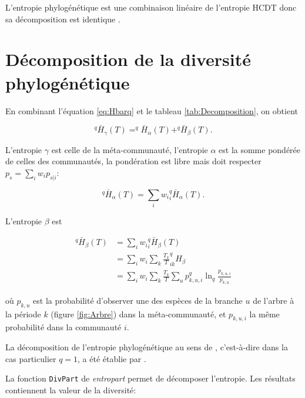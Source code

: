 \documentclass[
  11pt,
  french,
  a4paper,
  extrafontsizes,onecolumn,openright
  ]{memoir}
\begin{document}
\normalsize

L'entropie phylogénétique est une combinaison linéaire de l'entropie HCDT donc sa décomposition est identique \autocite{Marcon2014b}.

\hypertarget{duxe9composition-de-la-diversituxe9-phyloguxe9nuxe9tique}{%
\section{Décomposition de la diversité phylogénétique}\label{duxe9composition-de-la-diversituxe9-phyloguxe9nuxe9tique}}

En combinant l'équation \eqref{eq:Hbarq} et le tableau \ref{tab:Decomposition}, on obtient

\begin{equation}
  \label{eq:Hqbar}
  ^{q}\!\bar{H}_{\gamma}\left(T\right)
  = ^{q}\!\bar{H}_{\alpha}\left(T\right)
  + ^{q}\!\bar{H}_{\beta}\left(T\right).
\end{equation}

L'entropie \(\gamma\) est celle de la méta-communauté, l'entropie \(\alpha\) est la somme pondérée de celles des communautés, la pondération est libre mais doit respecter \(p_s=\sum_i{w_ip_{s|i}}\):

\begin{equation}
  \label{eq:Hqbaralpha}
  ^{q}\!\bar{H}_{\alpha}\left(T\right)
  = \sum_i{w_i{^{q}_{i}\!\bar{H}_{\alpha}}\left(T\right)}.
\end{equation}

L'entropie \(\beta\) est

\begin{align}
  \label{eq:Hqbarbeta}
  ^{q}\!\bar{H}_{\beta}\left(T\right)
  &= \sum_i{w_i}^{q}_{i}\!\bar{H}_{\beta}\left(T\right)\\
  &= \sum_i{w_i}\sum_k{\frac{T_k}{T}^{q}_{ik}\!H_{\beta}}\\
  &= \sum_i{w_i}\sum_k{\frac{T_k}{T}\sum_u{p^{q}_{k,u,i}\ln_q\frac{p_{k,u,i}}{p_{k,u}}}}
\end{align}

où \(p_{k,u}\) est la probabilité d'observer une des espèces de la branche \(u\) de l'arbre à la période \(k\) (figure \ref{fig:Arbre}) dans la méta-communauté, et \(p_{k,u,i}\) la même probabilité dans la communauté \(i\).

La décomposition de l'entropie phylogénétique au sens de \textcite{Allen2009}, c'est-à-dire dans la cas particulier \(q=1\), a été établie par \textcite{Mouchet2011}.

La fonction \texttt{DivPart} de \emph{entropart} permet de décomposer l'entropie.
Les résultats contiennent la valeur de la diversité:
\end{document}
